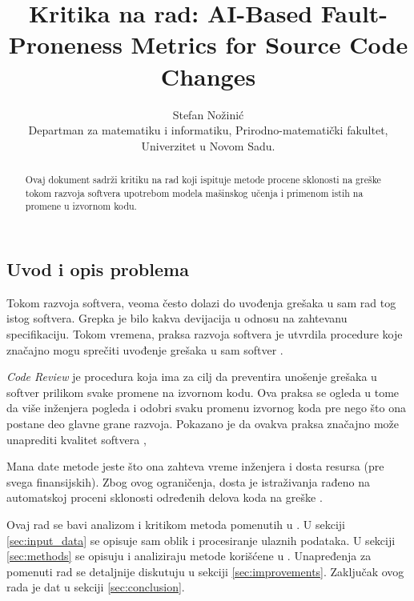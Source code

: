 \documentclass[twocolumns]{article}
\begin{document}
\title{Kritika na rad: AI-Based Fault-Proneness Metrics for Source Code Changes}
\author{Stefan Nožinić \\
Departman za matematiku i informatiku, Prirodno-matematički fakultet, Univerzitet u Novom Sadu. \\
}

\maketitle
\begin{abstract}
    Ovaj dokument sadrži kritiku na rad koji ispituje metode procene sklonosti na greške tokom razvoja softvera upotrebom modela mašinskog učenja i primenom istih na promene u izvornom kodu. 
\end{abstract}


\begin{multicols}{2}

  \section{Uvod i opis problema}
  \label{sec:introduction}
  
  Tokom razvoja softvera, veoma često dolazi do uvođenja grešaka u sam rad tog istog softvera. Grepka je bilo kakva devijacija u odnosu na zahtevanu specifikaciju. Tokom vremena, praksa razvoja softvera je utvrdila procedure koje značajno mogu sprečiti uvođenje grešaka u sam softver \cite{kozlov2013fault}. 
  
  \textit{Code Review} je procedura koja ima za cilj da preventira unošenje grešaka u softver prilikom svake promene na izvornom kodu. Ova praksa se ogleda u tome da više inženjera pogleda i odobri svaku promenu izvornog koda pre nego što ona postane deo glavne grane razvoja. Pokazano je da ovakva praksa značajno može unaprediti kvalitet softvera \cite{kozlov2013fault},
  
  Mana date metode jeste što ona zahteva vreme inženjera i dosta resursa (pre svega finansijskih). Zbog ovog ograničenja, dosta je istraživanja rađeno na automatskoj proceni sklonosti određenih delova koda na greške \cite{altiero2023ai,fenton1999critique,gondra2008applying,ouellet2023combining}. 
  
  Ovaj rad se bavi analizom i kritikom metoda pomenutih u \cite{altiero2023ai}. U sekciji \ref{sec:input_data} se opisuje sam oblik i procesiranje ulaznih podataka. U sekciji \ref{sec:methods} se opisuju i analiziraju metode korišćene u \cite{altiero2023ai}. Unapređenja za pomenuti rad se detaljnije diskutuju u sekciji \ref{sec:improvements}. Zaključak ovog rada je dat u sekciji \ref{sec:conclusion}.
  

\end{multicols}
\end{document}
